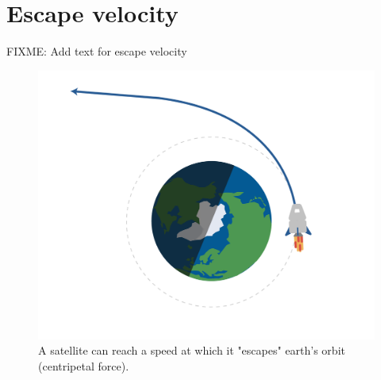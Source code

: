 \section{Escape velocity}
FIXME: Add text for escape velocity
\begin{figure}[htbp]
    \centering
    \includegraphics[width=.75\textwidth]{escape.png}
    \caption{A satellite can reach a speed at which it "escapes" earth's orbit (centripetal force).}
    \label{fig:escape}
\end{figure}


